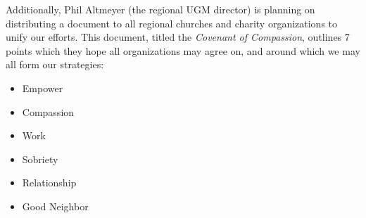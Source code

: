         \par Additionally, Phil Altmeyer (the regional UGM director) is planning on distributing a document to all regional churches and charity organizations to unify our efforts.
        This document, titled the \textit{Covenant of Compassion}, outlines 7 points which they hope all organizations may agree on, and around which we may all form our strategies:
        \begin{itemize}
            \item{Empower}
            \item{Compassion}
            \item{Work}
            \item{Sobriety}
            \item{Relationship}
            \item{Good Neighbor}
        \end{itemize}

